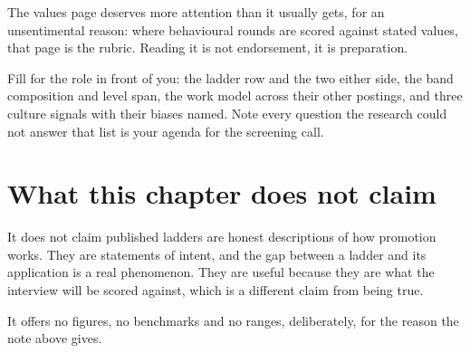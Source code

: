 
The values page deserves more attention than it usually gets, for an unsentimental
reason: where behavioural rounds are scored against stated values, that page is
the rubric. Reading it is not endorsement, it is preparation.

\begin{drill}
Fill  for the role in front of you: the ladder
row and the two either side, the band composition and level span, the work
model across their other postings, and three culture signals with their
biases named. Note every question the research could not answer \dash{} that
list is your agenda for the screening call.
\end{drill}

\section*{What this chapter does not claim}

It does not claim published ladders are honest descriptions of how promotion
works. They are statements of intent, and the gap between a ladder and its
application is a real phenomenon. They are useful because they are what the
interview will be scored against, which is a different claim from being true.

It offers no figures, no benchmarks and no ranges, deliberately, for the reason
the note above gives.
